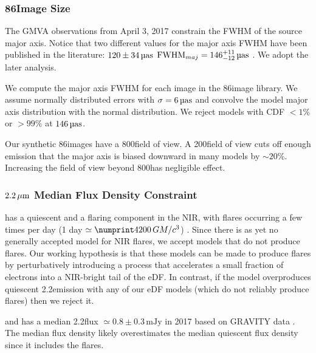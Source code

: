 \subsubsection{86\GHz Image Size}\label{sec:86size}

The GMVA observations from April 3, 2017 constrain the FWHM of the source major axis.
Notice that two different values for the major axis FWHM have been published in the literature: $120 \pm 34\uas$ \citep{2019ApJ...871...30I}
${\rm FWHM}_{maj} = 146^{+11}_{-12}\uas$ \citep[95\% confidence][]{2021ApJ...915...99I}.
We adopt the later analysis.

We compute the major axis FWHM for each image in the 86\GHz image library.
We assume normally distributed errors with $\sigma = 6\uas$ and convolve the model major axis distribution with the normal distribution.
We reject models with CDF $< 1\%$ or $> 99\%$ at $146\uas$.

Our synthetic 86\GHz images have a 800\uas field of view.
A 200\uas field of view cuts off enough emission that the major axis is biased downward in many models by $\sim 20\%$.
Increasing the field of view beyond 800\uas has negligible effect.

\subsubsection{$2.2\,\mu\mathrm{m}$ Median Flux Density Constraint}\label{subsec:nir}

\sgra has a quiescent and a flaring component in the NIR, with flares occurring a few times per day
(1 day $\simeq \no{4200}\,\tg$) \citep{2018ApJ...863...15W}.
Since there is as yet no generally accepted model for NIR flares, we accept models that do not produce flares.
Our working hypothesis is that these models can be made to produce flares by perturbatively introducing a process that accelerates a small fraction of electrons into a  NIR-bright tail of the eDF.
In contrast, if the model overproduces quiescent 2.2\um emission with any of our eDF models (which do not reliably produce flares) then we reject it.

\sgra and has a median 2.2\um flux $\simeq 0.8 \pm 0.3\,\mathrm{mJy}$ in 2017 based on GRAVITY data \citep[][see Table 1]{2020A&A...638A...2G}.
The median flux density likely overestimates the median quiescent flux density since it includes the flares.

